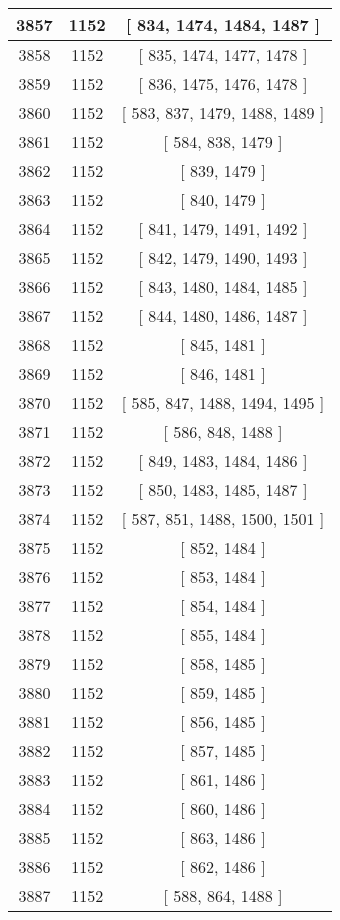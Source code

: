 \begin{center}
\begin{longtable}[H]{|| c c c ||}
\hline
3857 & 1152 & [ 834, 1474, 1484, 1487 ] \\ 
\hline
3858 & 1152 & [ 835, 1474, 1477, 1478 ] \\ 
\hline
3859 & 1152 & [ 836, 1475, 1476, 1478 ] \\ 
\hline
3860 & 1152 & [ 583, 837, 1479, 1488, 1489 ] \\ 
\hline
3861 & 1152 & [ 584, 838, 1479 ] \\ 
\hline
3862 & 1152 & [ 839, 1479 ] \\ 
\hline
3863 & 1152 & [ 840, 1479 ] \\ 
\hline
3864 & 1152 & [ 841, 1479, 1491, 1492 ] \\ 
\hline
3865 & 1152 & [ 842, 1479, 1490, 1493 ] \\ 
\hline
3866 & 1152 & [ 843, 1480, 1484, 1485 ] \\ 
\hline
3867 & 1152 & [ 844, 1480, 1486, 1487 ] \\ 
\hline
3868 & 1152 & [ 845, 1481 ] \\ 
\hline
3869 & 1152 & [ 846, 1481 ] \\ 
\hline
3870 & 1152 & [ 585, 847, 1488, 1494, 1495 ] \\ 
\hline
3871 & 1152 & [ 586, 848, 1488 ] \\ 
\hline
3872 & 1152 & [ 849, 1483, 1484, 1486 ] \\ 
\hline
3873 & 1152 & [ 850, 1483, 1485, 1487 ] \\ 
\hline
3874 & 1152 & [ 587, 851, 1488, 1500, 1501 ] \\ 
\hline
3875 & 1152 & [ 852, 1484 ] \\ 
\hline
3876 & 1152 & [ 853, 1484 ] \\ 
\hline
3877 & 1152 & [ 854, 1484 ] \\ 
\hline
3878 & 1152 & [ 855, 1484 ] \\ 
\hline
3879 & 1152 & [ 858, 1485 ] \\ 
\hline
3880 & 1152 & [ 859, 1485 ] \\ 
\hline
3881 & 1152 & [ 856, 1485 ] \\ 
\hline
3882 & 1152 & [ 857, 1485 ] \\ 
\hline
3883 & 1152 & [ 861, 1486 ] \\ 
\hline
3884 & 1152 & [ 860, 1486 ] \\ 
\hline
3885 & 1152 & [ 863, 1486 ] \\ 
\hline
3886 & 1152 & [ 862, 1486 ] \\ 
\hline
3887 & 1152 & [ 588, 864, 1488 ] \\ 

\end{longtable}
\end{center}
